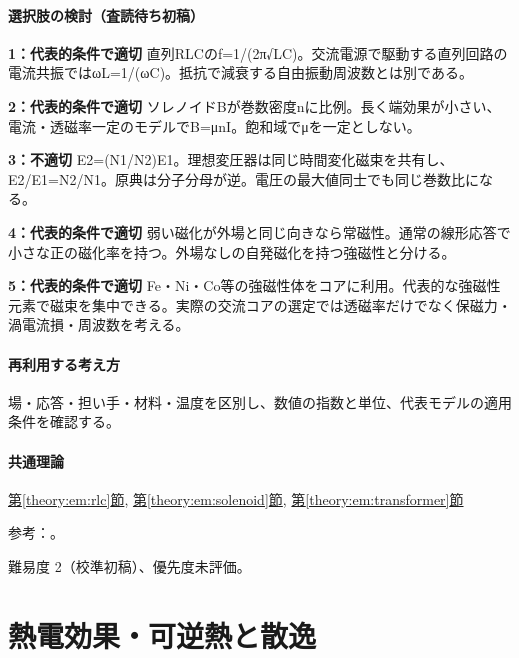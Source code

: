 \paragraph{選択肢の検討（査読待ち初稿）}\mbox{}\par

\noindent\textbf{1：代表的条件で適切} 直列RLCのf=\allowbreak{}1/(2π√LC)。交流電源で駆動する直列回路の電流共振ではωL=\allowbreak{}1/(ωC)。抵抗で減衰する自由振動周波数とは別である。\par

\noindent\textbf{2：代表的条件で適切} ソレノイドBが巻数密度nに比例。長く端効果が小さい、電流・透磁率一定のモデルでB=μnI。飽和域でμを一定としない。\par

\noindent\textbf{3：不適切} E2=\allowbreak{}(N1/N2)E1。理想変圧器は同じ時間変化磁束を共有し、E2/E1=\allowbreak{}N2/N1。原典は分子分母が逆。電圧の最大値同士でも同じ巻数比になる。\par

\noindent\textbf{4：代表的条件で適切} 弱い磁化が外場と同じ向きなら常磁性。通常の線形応答で小さな正の磁化率を持つ。外場なしの自発磁化を持つ強磁性と分ける。\par

\noindent\textbf{5：代表的条件で適切} Fe・Ni・Co等の強磁性体をコアに利用。代表的な強磁性元素で磁束を集中できる。実際の交流コアの選定では透磁率だけでなく保磁力・渦電流損・周波数を考える。\par

\paragraph{再利用する考え方} 場・応答・担い手・材料・温度を区別し、数値の指数と単位、代表モデルの適用条件を確認する。

\paragraph{共通理論} \hyperref[theory:em:rlc]{第\ref*{theory:em:rlc}節}, \hyperref[theory:em:solenoid]{第\ref*{theory:em:solenoid}節}, \hyperref[theory:em:transformer]{第\ref*{theory:em:transformer}節}

\par 参考：\cite{mit_em12,mit_em09,em51_transformer_ref,openstax_magnetism}。

\par 難易度 2（校準初稿）、優先度未評価。

\section{熱電効果・可逆熱と散逸}

